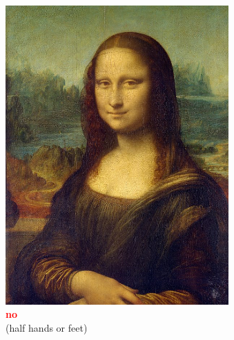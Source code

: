 \documentclass[hyperref={pdfpagelabels=false},aspectratio=169]{beamer}
\begin{document}
\begin{frame}
	\begin{columns}[T,onlytextwidth]
	\begin{figure} 
		\centering
		\def\svgwidth{1\textwidth}
\includegraphics[width=1\textwidth]{haende_ab.jpg} \\
		\textcolor{red}{\textbf{no}}	\\(half hands or feet)
	\end{figure}
	\begin{figure} 
		\centering
		\def\svgwidth{1\textwidth}

\end{figure}
\end{columns}
\end{frame}
\end{document}
